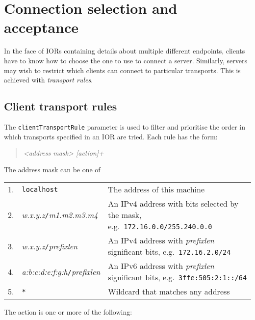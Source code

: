 \documentclass[11pt,oneside,a4paper]{book}
\newcommand{\code}[1]{\texttt{#1}}
\newcommand{\term}[1]{\textit{#1}}
\begin{document}
\section{Connection selection and acceptance}

In the face of IORs containing details about multiple different
endpoints, clients have to know how to choose the one to use to
connect a server. Similarly, servers may wish to restrict which
clients can connect to particular transports. This is achieved with
\term{transport rules}.


\subsection{Client transport rules}
\label{sec:clientRule}

The \code{clientTransportRule} parameter is used to filter and
prioritise the order in which transports specified in an IOR are
tried. Each rule has the form:

\begin{quote}
\textit{<address mask> [action]+}
\end{quote}

\noindent The address mask can be one of

\vspace{\baselineskip}

\begin{tabular}{llp{}}
1. & \code{localhost} & The address of this machine\\

2. & \textit{w.x.y.z}\code{/}\textit{m1.m2.m3.m4} & An IPv4 address
     with bits selected by the mask, e.g.\
     \code{172.16.0.0/255.240.0.0}\\

3. & \textit{w.x.y.z}\code{/}\textit{prefixlen} & An IPv4 address with
     \textit{prefixlen} significant bits, e.g.\
     \code{172.16.2.0/24}\\

4. & \textit{a:b:c:d:e:f:g:h}\code{/}\textit{prefixlen} & An IPv6
     address with \textit{prefixlen} significant bits, e.g.\
     \code{3ffe:505:2:1::/64}\\

5. & \code{*} & Wildcard that matches any address\\
\end{tabular}

\vspace{\baselineskip}

\noindent The action is one or more of the following:
\end{document}
